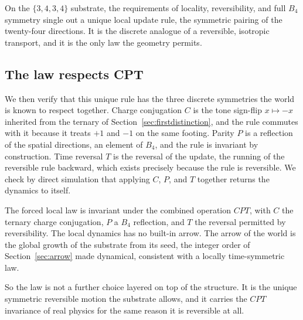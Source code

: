 \begin{result}
On the $\{3,4,3,4\}$ substrate, the requirements of locality, reversibility, and full $B_4$ symmetry single out a
unique local update rule, the symmetric pairing of the twenty-four directions. It is the discrete analogue of a
reversible, isotropic transport, and it is the only law the geometry permits.
\end{result}

\subsection{The law respects CPT}

We then verify that this unique rule has the three discrete symmetries the world is known to respect together. Charge
conjugation $C$ is the tone sign-flip $x \mapsto -x$ inherited from the ternary of Section~\ref{sec:firstdistinction},
and the rule commutes with it because it treats $+1$ and $-1$ on the same footing. Parity $P$ is a reflection of the
spatial directions, an element of $B_4$, and the rule is invariant by construction. Time reversal $T$ is the reversal
of the update, the running of the reversible rule backward, which exists precisely because the rule is reversible. We
check by direct simulation that applying $C$, $P$, and $T$ together returns the dynamics to itself.

\begin{result}[CPT]
The forced local law is invariant under the combined operation $CPT$, with $C$ the ternary charge conjugation, $P$ a
$B_4$ reflection, and $T$ the reversal permitted by reversibility. The local dynamics has no built-in arrow. The arrow
of the world is the global growth of the substrate from its seed, the integer order of Section~\ref{sec:arrow} made
dynamical, consistent with a locally time-symmetric law.
\end{result}

So the law is not a further choice layered on top of the structure. It is the unique symmetric reversible motion the
substrate allows, and it carries the $CPT$ invariance of real physics for the same reason it is reversible at all.
